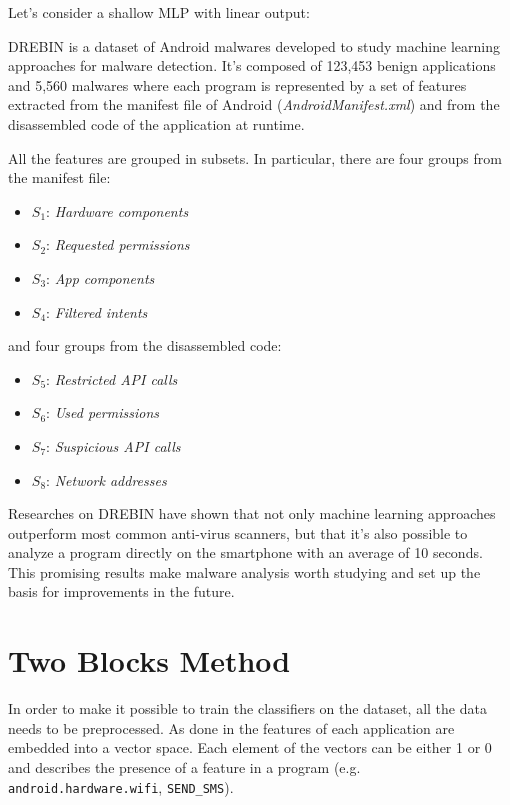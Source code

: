 \documentclass[paper=a4, fontsize=11pt]{scrartcl} %
\numberwithin{equation}{section} %
\numberwithin{figure}{section} %
\numberwithin{table}{section} %
\theoremstyle{definition}
\begin{document}
Let's consider a shallow MLP with linear output:

DREBIN is a dataset of Android malwares developed to study machine learning
approaches for malware detection. It's composed of 123,453 benign
applications and 5,560 malwares where each program is represented by a set of features extracted from the
manifest file of Android (\textit{AndroidManifest.xml}) and from the disassembled code
of the application at runtime.

All the features are grouped in subsets. In particular,
there are four groups from the manifest file:

\begin{itemize}
	\itemsep0em
	\item $S_1$: \textit{Hardware components}
	\item $S_2$: \textit{Requested permissions}
	\item $S_3$: \textit{App components}
	\item $S_4$: \textit{Filtered intents}
\end{itemize}

\noindent and four groups from the disassembled code:

\begin{itemize}
	\itemsep0em
	\item $S_5$: \textit{Restricted API calls}
	\item $S_6$: \textit{Used permissions}
	\item $S_7$: \textit{Suspicious API calls}
	\item $S_8$: \textit{Network addresses}
\end{itemize}

Researches on DREBIN have shown that not only machine learning
approaches outperform most common anti-virus scanners, but that it's also
possible to analyze a program directly on the smartphone with an average of
10 seconds\cite{drebin-paper}. This promising results make malware analysis
worth studying and set up the basis for improvements in the future.


\section{Two Blocks Method}
\label{section:preprocessing}

In order to make it possible to train the classifiers on the dataset, all the
data needs to be preprocessed. As done in \cite{drebin-paper} the features of
each application are embedded into a vector space. Each element of the vectors
can be either 1 or 0 and describes the presence of a feature in a program
(e.g. \texttt{android.hardware.wifi}, \texttt{SEND\_SMS}).
\end{document}
